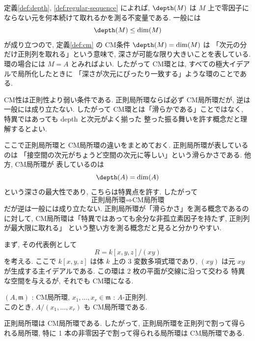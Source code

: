 \documentclass[article,paper=b5paper]{jlreq}
\begin{document}
定義\ref{def:depth}, \ref{def:regular-sequence} によれば, $\depth(M)$ は
$M$ 上で零因子にならない元を何本続けて取れるかを測る不変量である. 一般には
\[
    \depth(M)\le \dim(M)
\]
が成り立つので, 定義\ref{def:cm} の CM条件 $\depth(M)=\dim(M)$ は
「次元の分だけ正則列を取れる」という意味で, 深さが可能な限り大きいことを表している.
環の場合には $M=A$ とみればよい. したがって CM環とは, すべての極大イデアルで局所化したときに
「深さが次元にぴったり一致する」ような環のことである.

CM性は正則性より弱い条件である. 正則局所環ならば必ず CM局所環だが, 逆は一般には成り立たない.
したがって CM環とは「滑らかである」ことではなく, 特異ではあっても depth と次元がよく揃った
整った振る舞いを許す概念だと理解するとよい.

\begin{rem}
    ここで正則局所環と CM局所環の違いをまとめておく. 正則局所環が表しているのは
    「接空間の次元がちょうど空間の次元に等しい」という滑らかさである. 他方, CM局所環が
    表しているのは
    \[
        \depth(A)=\dim(A)
    \]
    という深さの最大性であり, こちらは特異点を許す. したがって
    \[
        \text{正則局所環} \Longrightarrow \text{CM局所環}
    \]
    だが逆は一般には成り立たない. 正則局所環が「滑らかさ」を測る概念であるのに対して,
    CM局所環は「特異ではあっても余分な非孤立素因子を持たず, 正則列が最大限に取れる」
    という整い方を測る概念だと見ると分かりやすい.
\end{rem}

まず, その代表例として
\[
    R = k[x,y,z]/(xy)
\]
を考える. ここで $k[x,y,z]$ は体 $k$ 上の 3 変数多項式環であり,
$(xy)$ は元 $xy$ が生成する主イデアルである. この環は 2 枚の平面が交線に沿って交わる
特異な空間を与えるが, それでも CM環になる.

\begin{prop}\label{prop:cm-quotient}
    \quad $(A,\mathfrak{m})$ : CM局所環, $x_1,\dots,x_r \in \mathfrak{m}$ : $A$-正則列. \\
    このとき, $A/(x_1,\dots,x_r)$ も CM局所環である.
\end{prop}

\begin{cor}\label{cor:regular-local-cm}
    正則局所環は CM局所環である. したがって, 正則局所環を正則列で割って得られる局所環,
    特に 1 本の非零因子で割って得られる局所環は CM局所環である.
\end{cor}
\end{document}
